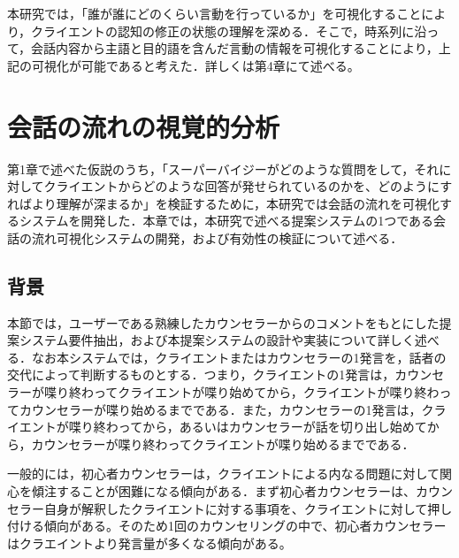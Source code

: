 \documentclass[shuuron]{kuee}
\begin{document}

本研究では，「誰が誰にどのくらい言動を行っているか」を可視化することにより，クライエントの認知の修正の状態の理解を深める．そこで，時系列に沿って，会話内容から主語と目的語を含んだ言動の情報を可視化することにより，上記の可視化が可能であると考えた．詳しくは第4章にて述べる。



\chapter{会話の流れの視覚的分析}

第1章で述べた仮説のうち，「スーパーバイジーがどのような質問をして，それに対してクライエントからどのような回答が発せられているのかを、どのようにすればより理解が深まるか」を検証するために，本研究では会話の流れを可視化するシステムを開発した．本章では，本研究で述べる提案システムの1つである会話の流れ可視化システムの開発，および有効性の検証について述べる．
\section{背景}


本節では，ユーザーである熟練したカウンセラーからのコメントをもとにした提案システム要件抽出，および本提案システムの設計や実装について詳しく述べる．なお本システムでは，クライエントまたはカウンセラーの1発言を，話者の交代によって判断するものとする．つまり，クライエントの1発言は，カウンセラーが喋り終わってクライエントが喋り始めてから，クライエントが喋り終わってカウンセラーが喋り始めるまでである．また，カウンセラーの1発言は，クライエントが喋り終わってから，あるいはカウンセラーが話を切り出し始めてから，カウンセラーが喋り終わってクライエントが喋り始めるまでである．


一般的には，初心者カウンセラーは，クライエントによる内なる問題に対して関心を傾注することが困難になる傾向がある．まず初心者カウンセラーは、カウンセラー自身が解釈したクライエントに対する事項を、クライエントに対して押し付ける傾向がある。そのため1回のカウンセリングの中で、初心者カウンセラーはクラエイントより発言量が多くなる傾向がある。
\end{document}

